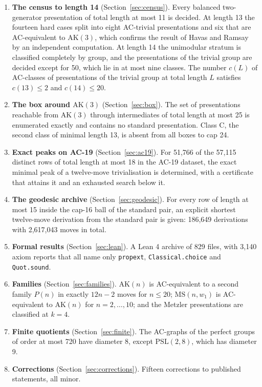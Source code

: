 \documentclass[11pt,a4paper]{article}
\theoremstyle{definition}
\newcommand{\AK}{\mathrm{AK}}
\newcommand{\MS}{\mathrm{MS}}
\begin{document}
\begin{enumerate}
\item \textbf{The census to length 14} (Section~\ref{sec:census}). Every balanced two-generator presentation of total length at most 11 is decided. At length 13 the fourteen hard cases split into eight AC-trivial presentations and six that are AC-equivalent to $\AK(3)$, which confirms the result of Havas and Ramsay by an independent computation. At length 14 the unimodular stratum is classified completely by group, and the presentations of the trivial group are decided except for 50, which lie in at most nine classes. The number $c(L)$ of AC-classes of presentations of the trivial group at total length $L$ satisfies $c(13)\le2$ and $c(14)\le20$.
\item \textbf{The box around $\AK(3)$} (Section~\ref{sec:box}). The set of presentations reachable from $\AK(3)$ through intermediates of total length at most 25 is enumerated exactly and contains no standard presentation. Class C, the second class of minimal length 13, is absent from all boxes to cap 24.
\item \textbf{Exact peaks on AC-19} (Section~\ref{sec:ac19}). For 51,766 of the 57,115 distinct rows of total length at most 18 in the AC-19 dataset, the exact minimal peak of a twelve-move trivialisation is determined, with a certificate that attains it and an exhausted search below it.
\item \textbf{The geodesic archive} (Section~\ref{sec:geodesic}). For every row of length at most 15 inside the cap-16 ball of the standard pair, an explicit shortest twelve-move derivation from the standard pair is given: 186,649 derivations with 2,617,043 moves in total.
\item \textbf{Formal results} (Section~\ref{sec:lean}). A Lean 4 archive of 829 files, with 3,140 axiom reports that all name only \texttt{propext}, \texttt{Classical.choice} and \texttt{Quot.sound}.
\item \textbf{Families} (Section~\ref{sec:families}). $\AK(n)$ is AC-equivalent to a second family $P(n)$ in exactly $12n-2$ moves for $n\le 20$; $\MS(n,w_1)$ is AC-equivalent to $\AK(n)$ for $n=2,\dots,10$; and the Metzler presentations are classified at $k=4$.
\item \textbf{Finite quotients} (Section~\ref{sec:finite}). The AC-graphs of the perfect groups of order at most 720 have diameter 8, except $\mathrm{PSL}(2,8)$, which has diameter 9.
\item \textbf{Corrections} (Section~\ref{sec:corrections}). Fifteen corrections to published statements, all minor.
\end{enumerate}
\end{document}
